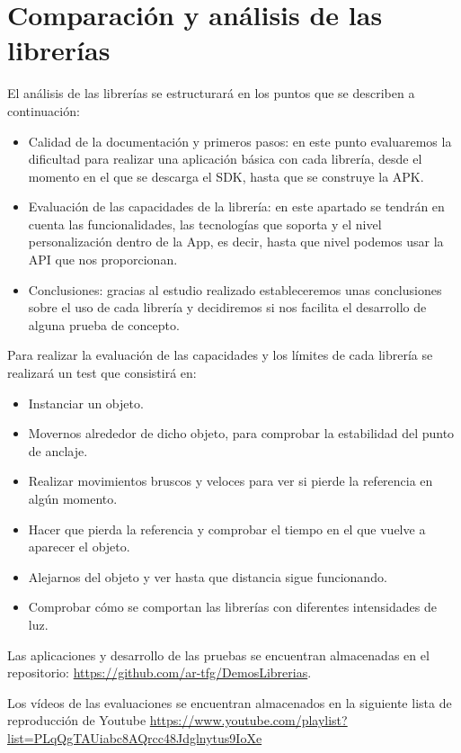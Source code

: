 
\chapter{Comparación y análisis de las librerías}
\renewcommand{\thefootnote}{\arabic{footnote}}
El análisis de las librerías se estructurará en los puntos que se describen a continuación:
\begin{itemize}
\item Calidad de la documentación y primeros pasos: en este punto evaluaremos la dificultad para realizar una aplicación básica con cada librería, desde el momento en el que se descarga el SDK, hasta que se construye la APK. 
\item Evaluación de las capacidades de la librería: en este apartado se tendrán en cuenta las funcionalidades, las tecnologías que soporta y el nivel personalización dentro de la App, es decir, hasta que nivel podemos usar la API que nos proporcionan.
\item Conclusiones: gracias al estudio realizado estableceremos unas conclusiones sobre el uso de cada librería y decidiremos si nos facilita el desarrollo de alguna prueba de concepto.
\end{itemize}


Para realizar la evaluación de las capacidades y los límites de cada librería se realizará un test que consistirá en:
\begin{itemize}
\item Instanciar un objeto.
\item Movernos alrededor de dicho objeto, para comprobar la estabilidad del punto de anclaje.
\item Realizar movimientos bruscos y veloces para ver si pierde la referencia en algún momento.
\item Hacer que pierda la referencia y comprobar el tiempo en el que vuelve a aparecer el objeto.
\item Alejarnos del objeto y ver hasta que distancia sigue funcionando.
\item Comprobar cómo se comportan las librerías con diferentes intensidades de luz.
\end{itemize}

Las aplicaciones y desarrollo de las pruebas se encuentran almacenadas en el repositorio: \url{https://github.com/ar-tfg/DemosLibrerias}.

Los vídeos de las evaluaciones se encuentran almacenados en la siguiente lista de reproducción de Youtube \url{ https://www.youtube.com/playlist?list=PLqQgTAUiabc8AQrcc48Jdglnytus9IoXe}

